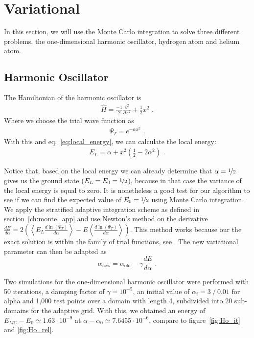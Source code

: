 
\section{Variational}
In this section, we will use the Monte Carlo integration to solve three different problems, the one-dimensional harmonic oscillator, hydrogen atom and helium atom.

\subsection{Harmonic Oscillator}
The Hamiltonian of the harmonic oscillator is
\begin{align*}
	\hat{H} = \frac{-1}{2}\frac{\partial^2}{ \partial x^2} + \frac{1}{2} x^2  \text{~.}
\end{align*}
Where we choose the trial wave function as
\begin{align*}
	\Psi_T = e^{-\alpha x^2} \text{~.}
\end{align*}
With this and eq.~\eqref{eq:local_energy}, we can calculate the local energy:
\begin{align*}
	E_L = \alpha + x^2 \left(\frac{1}{2} - 2\alpha^2\right) \text{~.}
\end{align*}
 	
Notice that, based on the local energy we can already determine that $\alpha = \nicefrac{1}{2}$ gives us the ground state ($E_L = E_0 = \nicefrac{1}{2}$), because in that case the variance of the local energy is equal to zero. It is nonetheless a good test for our algorithm to see if we can find the expected value of $E_0 = \nicefrac{1}{2}$ using Monte Carlo integration.\\
  
We apply the stratified adaptive integration scheme as defined in section~\ref{ch:monte_app} and use Newton's method on the derivative $\frac{dE}{d\alpha} = 2 (\left< E_L \frac{d \ln(\Psi_T)}{d \alpha} \right> - E\left<\frac{d \ln(\Psi_T)}{d \alpha}\right>)$. This method works because our the exact solution is within the family of trial functions, see \cite{JosBook}. %
The new variational parameter can then be adapted as $$\alpha_{\text{new}} = \alpha_{\text{old}} - \gamma \frac{dE}{d\alpha} \text{~.} $$

Two simulations for the one-dimensional harmonic oscillator were performed with 50 iterations, a damping factor of $\gamma = 10^{-5}$, an initial value of $\alpha_i = 3~/~ 0.01$ for alpha and 1,000 test points over a domain with length 4, subdivided into 20 sub-domains for the adaptive grid. With this, we obtained an energy of $E_{MC}-E_0 \simeq 1.63\cdot 10^{-9}$ at $\alpha - \alpha_0 \simeq 7.6455\cdot 10^{-6}$, compare to figure~\ref{fig:Ho_it} and \ref{fig:Ho_rel}. %


